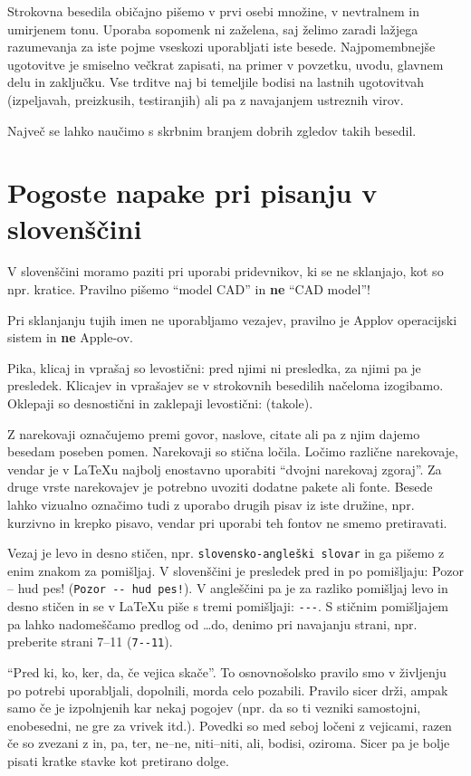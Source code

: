 \documentclass[a4paper,12pt,openright]{book}
\begin{document}
Strokovna besedila običajno pišemo v prvi osebi množine, v nevtralnem in umirjenem tonu. 
Uporaba sopomenk ni zaželena, saj želimo zaradi lažjega razumevanja za iste pojme vseskozi uporabljati iste besede.
Najpomembnejše ugotovitve je smiselno večkrat zapisati, na primer v povzetku, uvodu, glavnem delu in zaključku.
Vse trditve naj bi temeljile bodisi na lastnih ugotovitvah (izpeljavah, preizkusih, testiranjih) ali pa z navajanjem ustreznih virov.

Največ se lahko naučimo s skrbnim branjem dobrih zgledov takih besedil.


\chapter{Pogoste napake pri pisanju v slovenščini}  %
\label{slo}

V slovenščini moramo paziti  pri uporabi pridevnikov, ki se ne sklanjajo, kot so npr. kratice. 
Pravilno pišemo ``model CAD'' in \textbf{ne} ``CAD model''!

Pri sklanjanju tujih imen ne uporabljamo vezajev, pravilno je Applov operacijski sistem in \textbf{ne} Apple-ov.

Pika, klicaj in vprašaj so levostični: pred njimi ni presledka, za njimi pa je presledek. 
Klicajev in vprašajev se v strokovnih besedilih načeloma izogibamo. Oklepaji so desnostični in zaklepaji levostični: (takole).

Z narekovaji označujemo premi govor, naslove, citate ali pa z njim dajemo besedam poseben pomen. Narekovaji so stična ločila. Ločimo različne narekovaje, vendar je v
\LaTeX u najbolj enostavno uporabiti ``dvojni narekovaj zgoraj''. Za druge vrste narekovajev je potrebno uvoziti dodatne pakete ali fonte.
Besede lahko vizualno označimo tudi z uporabo drugih pisav  iz iste družine, npr. 
kurzivno in krepko pisavo, vendar pri uporabi teh fontov ne smemo pretiravati.

Vezaj  je levo in desno stičen, npr. \verb=slovensko-angleški slovar= in ga pišemo z enim znakom za pomišljaj.
V slovenščini je presledek pred in po pomišljaju: Pozor -- hud pes! (\verb=Pozor -- hud pes!=).
V angleščini pa je za razliko pomišljaj levo in desno stičen in se v \LaTeX u piše s tremi  pomišljaji: \verb=---=.
S stičnim pomišljajem pa lahko nadomeščamo predlog od \dots do, denimo pri navajanju strani, npr. preberite strani 7--11 (\verb=7--11=).

``Pred ki, ko, ker, da, če vejica skače''. 
To osnovnošolsko pravilo smo v življenju po potrebi uporabljali, dopolnili, morda celo pozabili. 
Pravilo sicer drži, ampak samo če je izpolnjenih kar nekaj pogojev (npr. da so ti vezniki samostojni, enobesedni, ne gre za vrivek itd.).
Povedki so med seboj ločeni z vejicami, razen če so zvezani z in, pa, ter, ne–ne, niti–niti, ali, bodisi, oziroma.
Sicer pa je bolje pisati kratke stavke kot pretirano dolge.
\end{document}
